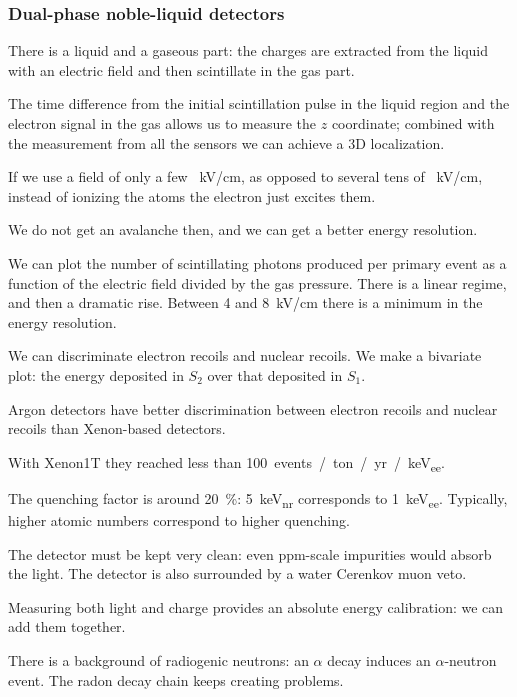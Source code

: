 \documentclass[main.tex]{subfiles}
\begin{document}
\subsubsection{Dual-phase noble-liquid detectors}


There is a liquid and a gaseous part: the
charges are extracted from the liquid with an electric field and 
then scintillate in the gas part. 

The time difference from the initial scintillation pulse in the
liquid region and the electron signal in the gas allows us to measure the \(z\) 
coordinate; combined with the measurement from all the 
sensors we can achieve a 3D localization. 

If we use a field of only a few \SI{}{kV/cm}, as opposed to several tens
of \SI{}{kV/cm}, instead of ionizing the atoms the electron just excites them.

We do not get an avalanche then, and we can get a better energy resolution. 

We can plot the number of scintillating photons produced per primary event
as a function of the electric field divided by the gas pressure. 
There is a linear regime, and then a dramatic rise. 
Between 4 and \SI{8}{kV/cm} there is a minimum in the energy resolution. 

We can discriminate electron recoils and nuclear recoils. 
We make a bivariate plot: the energy deposited in \(S_2 \) 
over that deposited in \(S_1 \). 

Argon detectors have better discrimination 
between electron recoils and nuclear recoils
than Xenon-based detectors.

With Xenon1T they reached less than \SI{100}{events / ton / yr / keV_{ee}}. 

The quenching factor is around \SI{20}{\percent}: \SI{5}{keV_{nr}} corresponds to \SI{1}{keV_{ee}}. 
Typically, higher atomic numbers correspond to higher quenching.

The detector must be kept very clean: even ppm-scale impurities would absorb the light. 
The detector is also surrounded by a water Cerenkov muon veto. 

Measuring both light and charge provides an absolute energy calibration: we can add them together. 

There is a background of radiogenic neutrons: an \(\alpha \) decay induces an \(\alpha \)-neutron event. 
The radon decay chain keeps creating problems.
\end{document}
